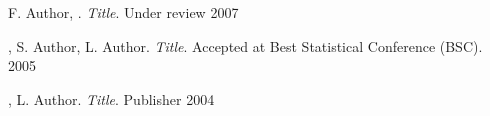 \begin{cvpubs}

 \cvpub
    {}
    {F. Author, . \textit{Title}. Under review}
    {2007}

  \cvpub
    {}
    {, S. Author, L. Author. \textit{Title}. Accepted at Best Statistical Conference (BSC).}
    {2005}
    
    \cvpub
    {}
    {, L. Author. \textit{Title}. Publisher}
    {2004}

\end{cvpubs}